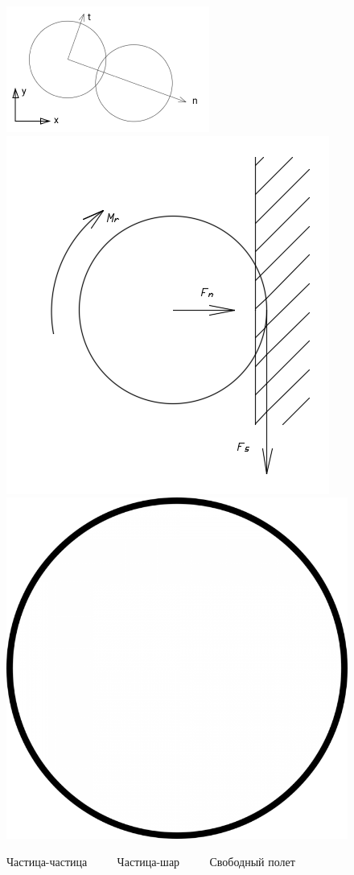 \documentclass[c]{beamer}  %
\begin{document}
\begin{frame}
\frametitle{\insertsection} 
\framesubtitle{\insertsubsection}

\begin{figure}[h!]
	\centering
	\vspace*{-2cm}
	\includegraphics[width=0.5\textheight]{local}
	\includegraphics[width=0.4\textheight]{ball_wall}
	\includegraphics[width=0.3\textheight]{ball_simple}
	\caption{Частица-частица $\qquad$ Частица-шар $\qquad$ Свободный полет $\qquad$}
\end{figure} 
\end{frame}
\end{document}
